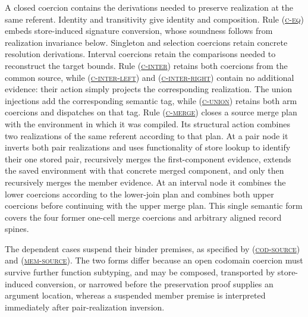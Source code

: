 \documentclass[acmsmall,screen,nonacm]{acmart}
\newcommand{\ruleref}[1]{%
  \textsc{(\hyperref[rule:#1]{#1})}}
\begin{document}
A closed coercion contains the derivations needed to preserve realization at
the same referent. Identity and transitivity give identity and composition.
Rule \ruleref{c-eq} embeds store-induced signature conversion, whose soundness
follows from realization invariance below.
Singleton and selection coercions retain concrete resolution derivations.
Interval coercions retain the comparisons needed to reconstruct the target
bounds.
Rule \ruleref{c-inter} retains both coercions from the common source, while
\ruleref{c-inter-left} and \ruleref{c-inter-right} contain no additional
evidence: their action simply projects the corresponding realization.
The union injections add the corresponding semantic tag, while
\ruleref{c-union} retains both arm coercions and dispatches on that tag.
Rule \ruleref{c-merge} closes a source merge plan with the environment in
which it was compiled. Its structural action combines two realizations of
the same referent according to that plan. At a pair node it inverts both pair
realizations and uses functionality of store lookup to identify their one
stored pair, recursively merges the first-component evidence, extends the
saved environment with that concrete merged component, and only then
recursively merges the member evidence. At an interval node it combines the
lower coercions according to the lower-join plan and combines both upper
coercions before continuing with the upper merge plan. This single semantic
form covers the four former one-cell merge coercions and arbitrary aligned
record spines.

The dependent cases suspend their binder premises, as specified by
\ruleref{cod-source} and \ruleref{mem-source}. The two forms differ because an
open codomain coercion must survive further function subtyping, and may be
composed, transported by store-induced conversion, or narrowed before the
preservation proof supplies an argument location, whereas a suspended member
premise is interpreted immediately after pair-realization inversion.
\end{document}
